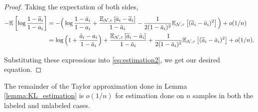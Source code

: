 \begin{proof}
Taking the expectation of both sides,
\begin{align*}
-\mathbb{E}_{}\left[\log \frac{1 - \widetilde{a}_i}{1 - a_i}\right] &= -\Big(\log \frac{1 - \bar{a}_i}{1 - a_i} + \frac{\mathbb{E}_{\mathcal{N}, \tau}\left[\bar{a}_i - \widetilde{a}_i\right]}{1 - \bar{a}_i} - \frac{1}{2(1 - \bar{a}_i)^2} \mathbb{E}_{\mathcal{N}, \tau}\left[(\widetilde{a}_i - \bar{a}_i)^2\right]\Big) + o(1/n) \\
&= \log \Big(1 +  \frac{\bar{a}_i - a_i}{1 - \bar{a}_i}\Big) + \frac{\mathbb{E}_{\mathcal{N}, \tau}\left[\widetilde{a}_i - \bar{a}_i\right]}{1 - \bar{a}_i} + \frac{1}{2(1 - \bar{a}_i)^2} \mathbb{E}_{\mathcal{N}, \tau}\left[(\widetilde{a}_i - \bar{a}_i)^2\right] + o(1/n).
\end{align*}

Substituting these expressions into \eqref{eq:estimation2}, we get our desired equation.

\end{proof}











\begin{lemma}
The remainder of the Taylor approximation done in Lemma \ref{lemma:KL_estimation} is $o(1/n)$ for estimation done on $n$ samples in both the labeled and unlabeled cases.
\label{lemma:taylor}
\end{lemma}

